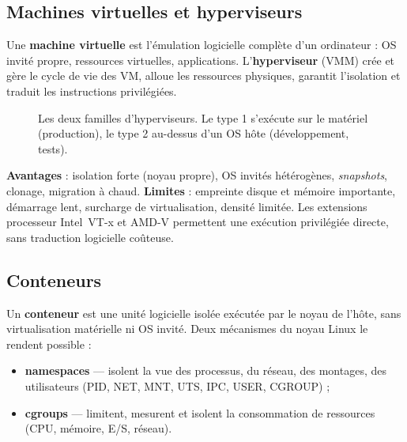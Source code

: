 \documentclass[11pt,a4paper]{article}
\begin{document}
\subsection{Machines virtuelles et hyperviseurs}
Une \textbf{machine virtuelle} est l'émulation logicielle complète d'un ordinateur : OS invité propre,
ressources virtuelles, applications. L'\textbf{hyperviseur} (VMM) crée et gère le cycle de vie des VM,
alloue les ressources physiques, garantit l'isolation et traduit les instructions privilégiées.

\begin{figure}[h]\centering
{}
\caption{Les deux familles d'hyperviseurs. Le type 1 s'exécute sur le matériel (production), le type 2 au-dessus d'un OS hôte (développement, tests).}
\end{figure}

\textbf{Avantages} : isolation forte (noyau propre), OS invités hétérogènes, \emph{snapshots}, clonage,
migration à chaud. \textbf{Limites} : empreinte disque et mémoire importante, démarrage lent, surcharge
de virtualisation, densité limitée. Les extensions processeur Intel~VT-x et AMD-V permettent une
exécution privilégiée directe, sans traduction logicielle coûteuse.

\subsection{Conteneurs}
Un \textbf{conteneur} est une unité logicielle isolée exécutée par le noyau de l'hôte, sans virtualisation
matérielle ni OS invité. Deux mécanismes du noyau Linux le rendent possible :
\begin{itemize}
\item \textbf{namespaces} --- isolent la vue des processus, du réseau, des montages, des utilisateurs
(PID, NET, MNT, UTS, IPC, USER, CGROUP) ;
\item \textbf{cgroups} --- limitent, mesurent et isolent la consommation de ressources (CPU, mémoire,
E/S, réseau).
\end{itemize}
\end{document}
